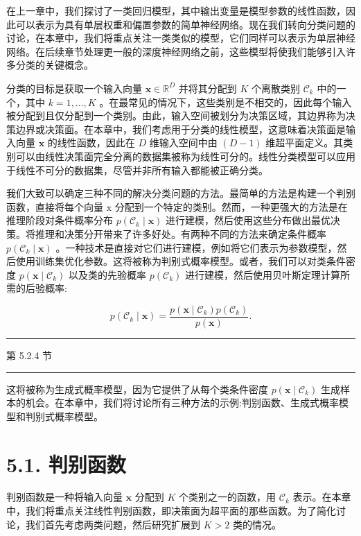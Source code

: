 \documentclass[10pt]{article}
\newcommand{\HRule}{\begin{center}\rule{0.9\linewidth}{0.2mm}\end{center}}
\begin{document}
在上一章中，我们探讨了一类回归模型，其中输出变量是模型参数的线性函数，因此可以表示为具有单层权重和偏置参数的简单神经网络。现在我们转向分类问题的讨论，在本章中，我们将重点关注一类类似的模型，它们同样可以表示为单层神经网络。在后续章节处理更一般的深度神经网络之前，这些模型将使我们能够引入许多分类的关键概念。

分类的目标是获取一个输入向量 \(\mathbf{x} \in  {\mathbb{R}}^{D}\) 并将其分配到 \(K\) 个离散类别 \({\mathcal{C}}_{k}\) 中的一个，其中 \(k = 1,\ldots ,K\) 。在最常见的情况下，这些类别是不相交的，因此每个输入被分配到且仅分配到一个类别。由此，输入空间被划分为决策区域，其边界称为决策边界或决策面。在本章中，我们考虑用于分类的线性模型，这意味着决策面是输入向量 \(\mathbf{x}\) 的线性函数，因此在 \(D\) 维输入空间中由 \(\left( {D - 1}\right)\) 维超平面定义。其类别可以由线性决策面完全分离的数据集被称为线性可分的。线性分类模型可以应用于线性不可分的数据集，尽管并非所有输入都能被正确分类。

我们大致可以确定三种不同的解决分类问题的方法。最简单的方法是构建一个判别函数，直接将每个向量 \(\mathrm{x}\) 分配到一个特定的类别。然而，一种更强大的方法是在推理阶段对条件概率分布 \(p\left( {{\mathcal{C}}_{k} \mid  \mathbf{x}}\right)\) 进行建模，然后使用这些分布做出最优决策。将推理和决策分开带来了许多好处。有两种不同的方法来确定条件概率 \(p\left( {{\mathcal{C}}_{k} \mid  \mathbf{x}}\right)\) 。一种技术是直接对它们进行建模，例如将它们表示为参数模型，然后使用训练集优化参数。这将被称为判别式概率模型。或者，我们可以对类条件密度 \(p\left( {\mathbf{x} \mid  {\mathcal{C}}_{k}}\right)\) 以及类的先验概率 \(p\left( {\mathcal{C}}_{k}\right)\) 进行建模，然后使用贝叶斯定理计算所需的后验概率:

\[
p\left( {{\mathcal{C}}_{k} \mid  \mathbf{x}}\right)  = \frac{p\left( {\mathbf{x} \mid  {\mathcal{C}}_{k}}\right) p\left( {\mathcal{C}}_{k}\right) }{p\left( \mathbf{x}\right) }. \tag{5.1}
\]

\HRule

第 5.2.4 节

\HRule

这将被称为生成式概率模型，因为它提供了从每个类条件密度 \(p\left( {\mathbf{x} \mid  {\mathcal{C}}_{k}}\right)\) 生成样本的机会。在本章中，我们将讨论所有三种方法的示例:判别函数、生成式概率模型和判别式概率模型。

\section*{5.1. 判别函数}

判别函数是一种将输入向量 \(\mathbf{x}\) 分配到 \(K\) 个类别之一的函数，用 \({\mathcal{C}}_{k}\) 表示。在本章中，我们将重点关注线性判别函数，即决策面为超平面的那些函数。为了简化讨论，我们首先考虑两类问题，然后研究扩展到 \(K > 2\) 类的情况。
\end{document}
